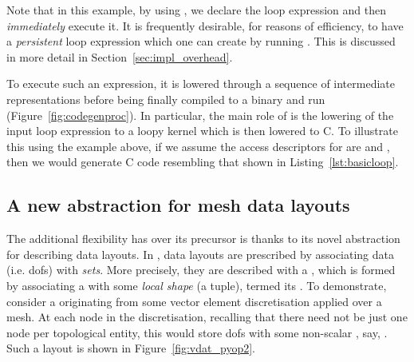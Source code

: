 Note that in this example, by using , we declare the loop expression and then \textit{immediately} execute it.
It is frequently desirable, for reasons of efficiency, to have a \textit{persistent} loop expression which one can create by running .
This is discussed in more detail in Section~\ref{sec:impl_overhead}.

To execute such an expression, it is lowered through a sequence of intermediate representations before being finally compiled to a binary and run (Figure~\ref{fig:codegenproc}).
In particular, the main role of  is the lowering of the input loop expression to a loopy kernel which is then lowered to C.
To illustrate this using the example above, if we assume the access descriptors for  are  and , then we would generate C code resembling that shown in Listing~\ref{lst:basicloop}.

\subsection{A new abstraction for mesh data layouts}
\label{sec:impl_datalayout}

The additional flexibility  has over its precursor  is thanks to its novel abstraction for describing data layouts.
In , data layouts are prescribed by associating data (i.e. \glspl{dof}) with \textit{sets}.
More precisely, they are described with a , which is formed by associating a  with some \textit{local shape} (a tuple), termed its .
To demonstrate, consider a   originating from some vector element discretisation applied over a mesh.
At each node in the discretisation, recalling that there need not be just one node per topological entity, this  would store \glspl{dof} with some non-scalar , say, .
Such a layout is shown in Figure~\ref{fig:vdat_pyop2}.

